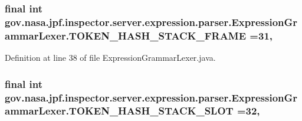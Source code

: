 \subsubsection[{\texorpdfstring{T\+O\+K\+E\+N\+\_\+\+H\+A\+S\+H\+\_\+\+S\+T\+A\+C\+K\+\_\+\+F\+R\+A\+ME}{TOKEN_HASH_STACK_FRAME}}]{\setlength{\rightskip}{0pt plus 5cm}final int gov.\+nasa.\+jpf.\+inspector.\+server.\+expression.\+parser.\+Expression\+Grammar\+Lexer.\+T\+O\+K\+E\+N\+\_\+\+H\+A\+S\+H\+\_\+\+S\+T\+A\+C\+K\+\_\+\+F\+R\+A\+ME =31\hspace{0.3cm}{\ttfamily [static]}, {\ttfamily [package]}}\hypertarget{classgov_1_1nasa_1_1jpf_1_1inspector_1_1server_1_1expression_1_1parser_1_1_expression_grammar_lexer_ad9df03351384513b06634513db9b4122}{}\label{classgov_1_1nasa_1_1jpf_1_1inspector_1_1server_1_1expression_1_1parser_1_1_expression_grammar_lexer_ad9df03351384513b06634513db9b4122}


Definition at line 38 of file Expression\+Grammar\+Lexer.\+java.

\subsubsection[{\texorpdfstring{T\+O\+K\+E\+N\+\_\+\+H\+A\+S\+H\+\_\+\+S\+T\+A\+C\+K\+\_\+\+S\+L\+OT}{TOKEN_HASH_STACK_SLOT}}]{\setlength{\rightskip}{0pt plus 5cm}final int gov.\+nasa.\+jpf.\+inspector.\+server.\+expression.\+parser.\+Expression\+Grammar\+Lexer.\+T\+O\+K\+E\+N\+\_\+\+H\+A\+S\+H\+\_\+\+S\+T\+A\+C\+K\+\_\+\+S\+L\+OT =32\hspace{0.3cm}{\ttfamily [static]}, {\ttfamily [package]}}\hypertarget{classgov_1_1nasa_1_1jpf_1_1inspector_1_1server_1_1expression_1_1parser_1_1_expression_grammar_lexer_a044601203de990d4218f23eb636f57bd}{}\label{classgov_1_1nasa_1_1jpf_1_1inspector_1_1server_1_1expression_1_1parser_1_1_expression_grammar_lexer_a044601203de990d4218f23eb636f57bd}


